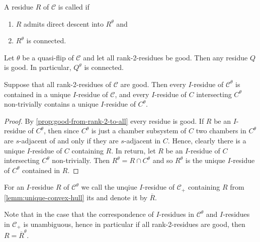 \begin{defi}
	A residue $R$ of $\mathcal{C}$ is called  if
	\begin{enumerate}
		\item $R$ admits direct descent into $R^\theta$ and
		\item $R^\theta$ is connected.
	\end{enumerate}
\end{defi}

\begin{prop}
	Let $\theta$ be a quasi-flip of $\mathcal{C}$ and let all rank-2-residues be good. Then any residue $Q$ is good. In particular, $Q^\theta$ is connected.
\end{prop}

\begin{lemm}
	Suppose that all rank-2-residues of $\mathcal C$ are good. Then every $I$-residue of $\mathcal C^\theta$ is contained in a unique $I$-residue of $\mathcal C$, and every $I$-residue of $C$ intersecting $C^\theta$ non-trivially contains a unique $I$-residue of $C^\theta$.

	\begin{proof}
		By \ref{prop:good-from-rank-2-to-all} every residue is good. If $R$ be an $I$-residue of $C^\theta$, then since $C^\theta$ is just a chamber subsystem of $C$ two chambers in $C^\theta$ are $s$-adjacent of and only if they are $s$-adjacent in $C$. Hence, clearly there is a unique $I$-residue of $C$ containing $R$. In return, let $R$ be an $I$-residue of $C$ intersecting $C^\theta$ non-trivially. Then $R^\theta = R \cap C^\theta$ and so $R^\theta$ is the unique $I$-residue of $C^\theta$ contained in $R$.
	\end{proof}
\end{lemm}

\begin{defi}
	For an $I$-residue $R$ of $\mathcal C^\theta$ we call the unqiue $I$-residue of $\mathcal C_+$ containing $R$ from \ref{lemm:unique-convex-hull} its  and denote it by $\overline R$.
\end{defi}

\begin{rema}
	Note that in the case that the correspondence of $I$-residues in $\mathcal C^\theta$ and $I$-residues in $\mathcal C_+$ is unambiguous, hence in particular if all rank-2-residues are good, then $R = \overline R^\theta$.
\end{rema}

